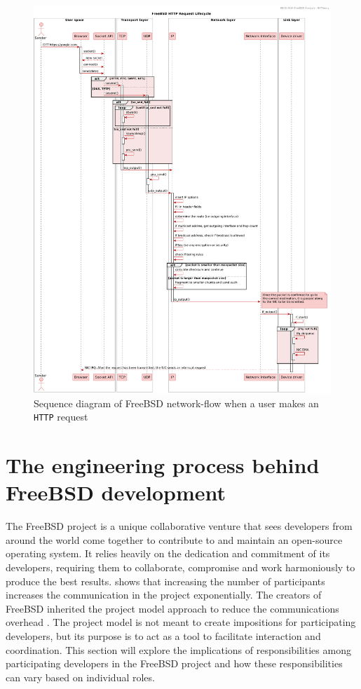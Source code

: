 \documentclass[12pt, dvipsnames, a4paper]{article}
\newcommand{\code}[1]{\texttt{#1}}
\begin{document}
\begin{figure}[!htb]
	\advance\leftskip-0.5cm
	\includegraphics[width = 570pt]{assets/sequence_diagrams/network-send-flow.pdf}
	\caption{Sequence diagram of FreeBSD network-flow when a user makes an \code{HTTP} request \cite{design}}
\end{figure}
\clearpage

\section{The engineering process behind FreeBSD development}

The FreeBSD project is a unique collaborative venture that sees developers from around the world come together to contribute to and maintain an open-source operating system. It relies heavily on the dedication and commitment of its developers, requiring them to collaborate, compromise and work harmoniously to produce the best results. \cite{brooks} shows that increasing the number of participants increases the communication in the project exponentially. The creators of FreeBSD inherited the project model approach to reduce the communications overhead \cite{dev-model}. The project model is not meant to create impositions for participating developers, but its purpose is to act as a tool to facilitate interaction and coordination. This section will explore the implications of responsibilities among participating developers in the FreeBSD project and how these responsibilities can vary based on individual roles.
\end{document}
